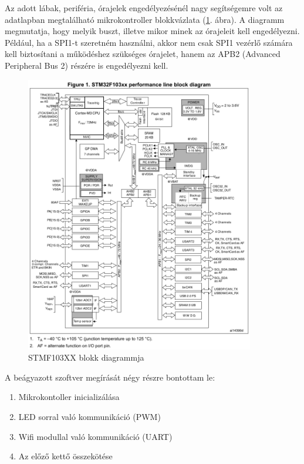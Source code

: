 \documentclass[../main.tex]{subfiles}
\begin{document}
        Az adott lábak, periféria, órajelek engedélyezésénél nagy segítségemre volt az adatlapban megtalálható mikrokontroller blokkvázlata (\ref{fig:stm32f103xx_block_diagram}. ábra). A diagramm megmutatja, hogy melyik buszt, illetve mikor minek az órajeleit kell engedélyezni. Például, ha a SPI1-t szeretném használni, akkor nem csak SPI1 vezérlő számára kell biztosítani a működéshez szükséges órajelet, hanem az APB2 (Advanced Peripheral Bus 2) részére is engedélyezni kell.
        \begin{figure}[h!]
            \centering
                \includegraphics[width=10cm]{resources/mbed_res/stm32f103xx_block_diagram.png}
                \caption{STMF103XX blokk diagrammja\cite{ds_stm32}}
                \label{fig:stm32f103xx_block_diagram}
        \end{figure}

    \newpage
        A beágyazott szoftver megírását négy részre bontottam le:
        \begin{enumerate}
            \item Mikrokontoller inicializálása
            \item LED sorral való kommunikáció (PWM)
            \item Wifi modullal való kommunikáció (UART)
            \item Az előző kettő összekötése
        \end{enumerate}
        
\end{document}
